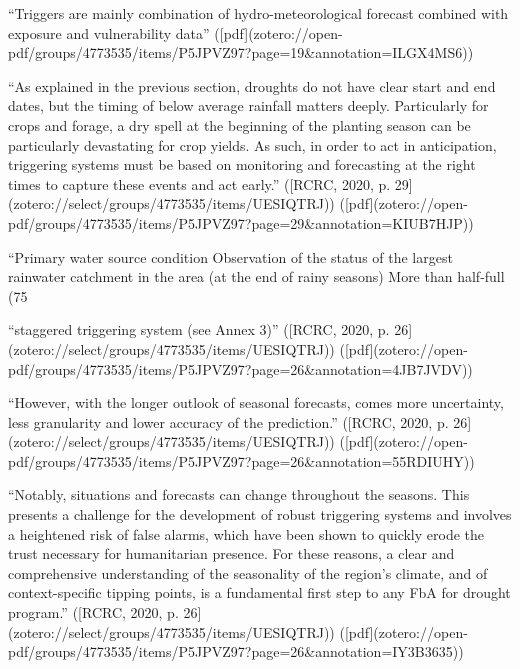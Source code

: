 {%
“Triggers are mainly combination of hydro-meteorological forecast combined with exposure and vulnerability data” ([pdf](zotero://open-pdf/groups/4773535/items/P5JPVZ97?page=19&annotation=ILGX4MS6))

“As explained in the previous section, droughts do not have clear start and end dates, but the timing of below average rainfall matters deeply. Particularly for crops and forage, a dry spell at the beginning of the planting season can be particularly devastating for crop yields. As such, in order to act in anticipation, triggering systems must be based on monitoring and forecasting at the right times to capture these events and act early.” ([RCRC, 2020, p. 29](zotero://select/groups/4773535/items/UESIQTRJ)) ([pdf](zotero://open-pdf/groups/4773535/items/P5JPVZ97?page=29&annotation=KIUB7HJP))

“Primary water source condition Observation of the status of the largest rainwater catchment in the area (at the end of rainy seasons) More than half-full (75%

“staggered triggering system (see Annex 3)” ([RCRC, 2020, p. 26](zotero://select/groups/4773535/items/UESIQTRJ)) ([pdf](zotero://open-pdf/groups/4773535/items/P5JPVZ97?page=26&annotation=4JB7JVDV))

“However, with the longer outlook of seasonal forecasts, comes more uncertainty, less granularity and lower accuracy of the prediction.” ([RCRC, 2020, p. 26](zotero://select/groups/4773535/items/UESIQTRJ)) ([pdf](zotero://open-pdf/groups/4773535/items/P5JPVZ97?page=26&annotation=55RDIUHY))

“Notably, situations and forecasts can change throughout the seasons. This presents a challenge for the development of robust triggering systems and involves a heightened risk of false alarms, which have been shown to quickly erode the trust necessary for humanitarian presence. For these reasons, a clear and comprehensive understanding of the seasonality of the region’s climate, and of context-specific tipping points, is a fundamental first step to any FbA for drought program.” ([RCRC, 2020, p. 26](zotero://select/groups/4773535/items/UESIQTRJ)) ([pdf](zotero://open-pdf/groups/4773535/items/P5JPVZ97?page=26&annotation=IY3B3635))

}

